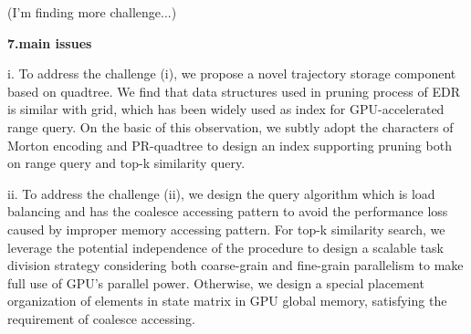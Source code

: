 \documentclass[conference]{IEEEtran}
\begin{document}
	
	(I'm finding more challenge...)
%	
%	
	
\textbf{7.main issues}

	i. To address the challenge (i), we propose a novel trajectory storage component based on quadtree. We find that data structures used in pruning process of EDR is similar with grid, which has been widely used as index for GPU-accelerated range query. On the basic of this observation, we subtly adopt the characters of Morton encoding and PR-quadtree to design an index supporting pruning both on range query and top-k similarity query.
	
	ii. To address the challenge (ii), we design the query algorithm which is load balancing and has the coalesce accessing pattern to avoid the performance loss caused by improper memory accessing pattern. For top-k similarity search, we leverage the potential independence of the procedure to design a scalable task division strategy considering both coarse-grain and fine-grain parallelism to make full use of GPU's parallel power. Otherwise, we design a special placement organization of elements in state matrix in GPU global memory, satisfying the requirement of coalesce accessing.
%	
%	
%	
	
\end{document}
